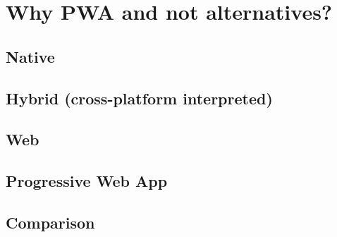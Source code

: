 \chapter{Why PWA and not alternatives?}

\section{Native}

\section{Hybrid (cross-platform interpreted)}

\section{Web}

\section{Progressive Web App}

\section{Comparison}